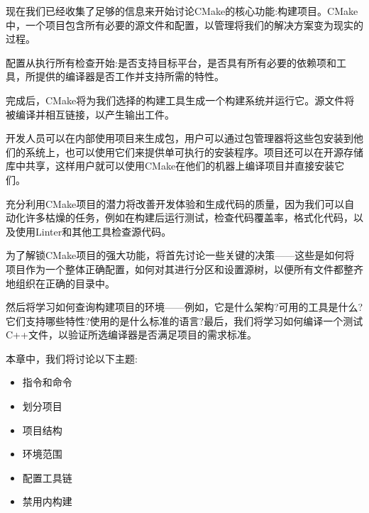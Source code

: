 现在我们已经收集了足够的信息来开始讨论CMake的核心功能:构建项目。CMake中，一个项目包含所有必要的源文件和配置，以管理将我们的解决方案变为现实的过程。

配置从执行所有检查开始:是否支持目标平台，是否具有所有必要的依赖项和工具，所提供的编译器是否工作并支持所需的特性。

完成后，CMake将为我们选择的构建工具生成一个构建系统并运行它。源文件将被编译并相互链接，以产生输出工件。

开发人员可以在内部使用项目来生成包，用户可以通过包管理器将这些包安装到他们的系统上，也可以使用它们来提供单可执行的安装程序。项目还可以在开源存储库中共享，这样用户就可以使用CMake在他们的机器上编译项目并直接安装它们。

充分利用CMake项目的潜力将改善开发体验和生成代码的质量，因为我们可以自动化许多枯燥的任务，例如在构建后运行测试，检查代码覆盖率，格式化代码，以及使用Linter和其他工具检查源代码。

为了解锁CMake项目的强大功能，将首先讨论一些关键的决策——这些是如何将项目作为一个整体正确配置，如何对其进行分区和设置源树，以便所有文件都整齐地组织在正确的目录中。

然后将学习如何查询构建项目的环境——例如，它是什么架构?可用的工具是什么?它们支持哪些特性?使用的是什么标准的语言?最后，我们将学习如何编译一个测试C++文件，以验证所选编译器是否满足项目的需求标准。

本章中，我们将讨论以下主题:

\begin{itemize}
\item 
指令和命令

\item 
划分项目

\item 
项目结构

\item 
环境范围

\item 
配置工具链

\item 
禁用内构建
\end{itemize}

